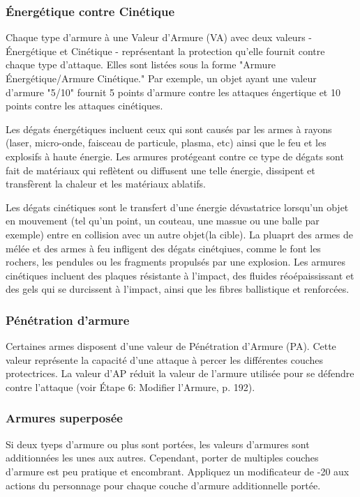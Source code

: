 \subsubsection{Énergétique contre Cinétique} 

Chaque type d'armure à une Valeur d'Armure (VA) avec deux valeurs - Énergétique et Cinétique - représentant la protection qu'elle fournit contre chaque type d'attaque. Elles sont listées sous la forme "Armure Énergétique/Armure Cinétique." Par exemple, un objet ayant une valeur d'armure "5/10" fournit 5 points d'armure contre les attaques éngertique et 10 points contre les attaques cinétiques. 

Les dégats énergétiques incluent ceux qui sont causés par les armes à rayons (laser, micro-onde, faisceau de particule, plasma, etc) ainsi que le feu et les explosifs à haute énergie. Les armures protégeant contre ce type de dégats sont fait de matériaux qui reflètent ou diffusent une telle énergie, dissipent et transfèrent la chaleur et les matériaux ablatifs. 

Les dégats cinétiques sont le transfert d'une énergie dévastatrice lorsqu'un objet en mouvement (tel qu'un point, un couteau, une massue ou une balle par exemple) entre en collision avec un autre objet(la cible). La pluaprt des armes de mélée et des armes à feu infligent des dégats cinétqiues, comme le font les rochers, les pendules ou les fragments propulsés par une explosion. Les armures cinétiques incluent des plaques résistante à l'impact, des fluides réoépaississant et des gels qui se durcissent à l'impact, ainsi que les fibres ballistique et renforcées. 

\subsubsection{Pénétration d'armure} 

Certaines armes disposent d'une valeur de Pénétration d'Armure (PA). Cette valeur représente la capacité d'une attaque à percer les différentes couches protectrices. La valeur d'AP réduit la valeur de l'armure utilisée pour se défendre contre l'attaque (voir Étape 6: Modifier l'Armure, p. 192). 

\subsubsection{Armures superposée} 

Si deux tyeps d'armure ou plus sont portées, les valeurs d'armures sont additionnées les unes aux autres. Cependant, porter de multiples couches d'armure est peu pratique et encombrant. Appliquez un modificateur de -20 aux actions du personnage pour chaque couche d'armure additionnelle portée. 

